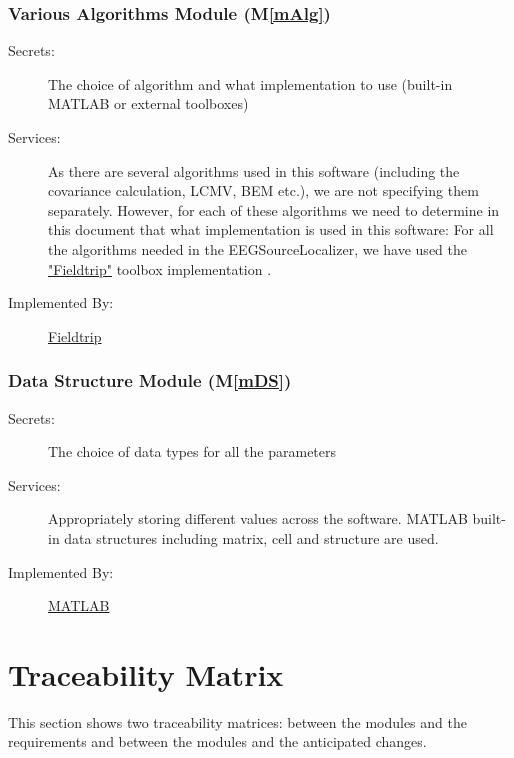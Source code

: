 \documentclass[12pt, titlepage]{article}
\newcommand{\mref}[1]{M\ref{#1}}
\renewcommand{\progname}{EEGSourceLocalizer}
\begin{document}
\subsubsection{Various Algorithms Module (\mref{mAlg})}
\begin{description}
\item[Secrets:] The choice of algorithm and what implementation to use (built-in MATLAB or external toolboxes)
\item[Services:] As there are several algorithms used in this software (including the covariance calculation, LCMV, BEM etc.), we are not specifying them separately. However, for each of these algorithms we need to determine in this document that what implementation is used in this software: For all the algorithms needed in the \progname{}, we have used the \href{https://www.fieldtriptoolbox.org} {"Fieldtrip"} toolbox implementation  . 
\item[Implemented By:] \href{https://www.fieldtriptoolbox.org} {Fieldtrip} 
\end{description}

\subsubsection{Data Structure Module (\mref{mDS})}
\begin{description}
\item[Secrets:] The choice of data types for all the parameters
\item[Services:] Appropriately storing different values across the software. MATLAB built-in data structures including matrix, cell and structure are used.

\item[Implemented By:] \href{https://www.mathworks.com/products/matlab.html}{MATLAB}
\end{description}



\section{Traceability Matrix} \label{SecTM}

This section shows two traceability matrices: between the modules and the
requirements and between the modules and the anticipated changes.
\end{document}
